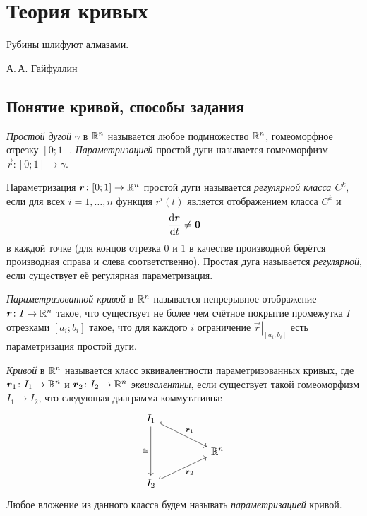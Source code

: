 \section{Теория кривых}

\epigraph{Рубины шлифуют алмазами.}{А.\,А. Гайфуллин}

\subsection{Понятие кривой, способы задания}

\begin{definition}
	\textit{Простой дугой} $\gamma$ в $\mathbb{R}^n$ называется любое подмножество $\mathbb{R}^n$, гомеоморфное отрезку $[0; 1]$. \textit{Параметризацией} простой дуги называется гомеоморфизм $\vec{r}\colon [0; 1] \to \gamma$.
\end{definition}

\begin{definition}
	Параметризация $\boldsymbol{r}\colon [0; 1] \to \mathbb{R}^n$ простой дуги называется \textit{регулярной класса $C^k$}, если для всех $i = 1, \ldots, n$ функция $r^i(t)$ является отображением класса $C^k$ и
	\[
		\frac{\mathop{}\!\mathrm{d}\boldsymbol{r}}{\mathop{}\!\mathrm{d} t} \ne \boldsymbol{0}
	\]
	в каждой точке (для концов отрезка $0$ и $1$ в качестве производной берётся производная справа и слева соответственно). Простая дуга называется \textit{регулярной}, если существует её регулярная параметризация.
\end{definition}

\begin{definition}
	\textit{Параметризованной кривой} в $\mathbb{R}^n$ называется непрерывное отображение $\boldsymbol{r}\colon I \to \mathbb{R}^n$ такое, что существует не более чем счётное покрытие промежутка $I$ отрезками $[a_i; b_i]$ такое, что для каждого $i$ ограничение $\left.\vec{r}\right|_{[a_i; b_i]}$ есть параметризация простой дуги.
\end{definition}

\begin{definition}
	\textit{Кривой} в $\mathbb{R}^n$ называется класс эквивалентности параметризованных кривых, где $\boldsymbol{r}_1\colon I_1 \to \mathbb{R}^n$ и $\boldsymbol{r}_2\colon I_2 \to \mathbb{R}^n$ \textit{эквивалентны}, если существует такой гомеоморфизм $I_1 \to I_2$, что следующая диаграмма коммутативна:
	\[\begin{tikzcd}
		{I_1} \\
		&& {\R^n} \\
		{I_2}
		\arrow["{\vec{r}_1}", hook, from=1-1, to=2-3]
		\arrow["\cong"', from=1-1, to=3-1]
		\arrow["{\vec{r}_2}"', hook, from=3-1, to=2-3]
	\end{tikzcd}\]
	Любое вложение из данного класса будем называть \textit{параметризацией} кривой.
\end{definition}

